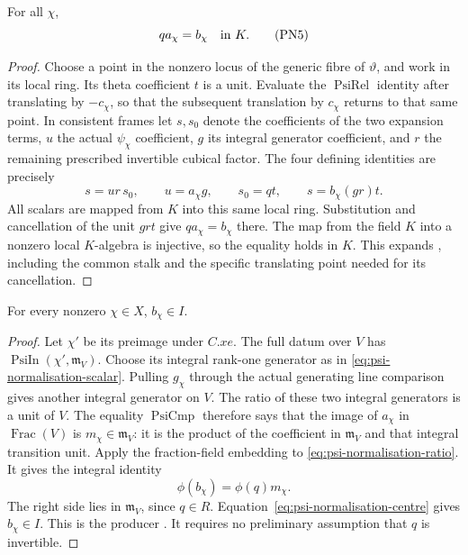 \begin{srlemma}
\label{lem:psi-normalisation-ratio}
For all \(\chi\),
\[
                             q a_\chi=b_\chi
                                      \quad\hbox{in }K.
 \tag{PN5}\label{eq:psi-normalisation-ratio}
\]
\end{srlemma}
\begin{proof}
Choose a point in the nonzero locus of the generic fibre of
\(\vartheta\), and work in its local ring.  Its theta coefficient
\(t\) is a unit.  Evaluate the
\(\operatorname{PsiRel}\) identity after translating by
\(-c_\chi\), so that the subsequent translation by \(c_\chi\)
returns to that same point. In consistent frames let
\(s,s_0\) denote the coefficients of the two expansion terms,
\(u\) the actual \(\psi_\chi\) coefficient, \(g\) its integral
generator coefficient, and \(r\) the remaining prescribed
invertible cubical factor.
The four defining identities are precisely
\[
             s=ur\,s_0,\qquad u=a_\chi g,\qquad
             s_0=qt,\qquad s=b_\chi(gr)t .
\]
All scalars are mapped from \(K\) into this same local ring.
Substitution and cancellation of the unit \(grt\) give
\(qa_\chi=b_\chi\) there. The map from the field \(K\) into a
nonzero local \(K\)-algebra is injective, so the equality holds
in \(K\).  This expands
, including the common stalk and the
specific translating point needed for its cancellation.
\end{proof}

\begin{srlemma}
\label{lem:psi-normalisation-positive-coefficients}
For every nonzero \(\chi\in X\), \(b_\chi\in I\).
\end{srlemma}
\begin{proof}
Let \(\chi'\) be its preimage under \(C.xe\). The full datum over
\(V\) has \(\operatorname{PsiIn}(\chi',\mathfrak m_V)\).
Choose its integral rank-one generator as in
\eqref{eq:psi-normalisation-scalar}.
Pulling \(g_\chi\) through the actual generating line
comparison gives another integral generator on \(V\).
The ratio of these two integral generators is a unit of \(V\).
The equality \(\operatorname{PsiCmp}\) therefore says that the
image of \(a_\chi\) in \(\operatorname{Frac}(V)\) is
\(m_\chi\in\mathfrak m_V\): it is the product of the
coefficient in \(\mathfrak m_V\) and that integral transition
unit.
Apply the fraction-field embedding to
\eqref{eq:psi-normalisation-ratio}. It gives the integral
identity
\[
                         \phi(b_\chi)=\phi(q)m_\chi .
\]
The right side lies in \(\mathfrak m_V\), since \(q\in R\).
Equation~\eqref{eq:psi-normalisation-centre} gives
\(b_\chi\in I\).
This is the producer
. It requires no preliminary
assumption that \(q\) is invertible.
\end{proof}

